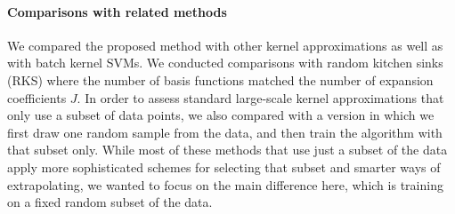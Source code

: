 \documentclass{article} %
\begin{document}
\paragraph{Comparisons with related methods}
We compared the proposed method with other kernel approximations as well as with batch kernel SVMs. We conducted comparisons with random kitchen sinks (RKS) where the number of basis functions matched the number of expansion coefficients $J$. In order to assess standard large-scale kernel approximations that only use a subset of data points, we also compared with a version in which we first draw one random sample from the data, and then train the algorithm with that subset only. While most of these methods that use just a subset of the data apply more sophisticated schemes for selecting that subset and smarter ways of extrapolating, we wanted to focus on the main difference here, which is training on a fixed random subset of the data. 
\end{document}
